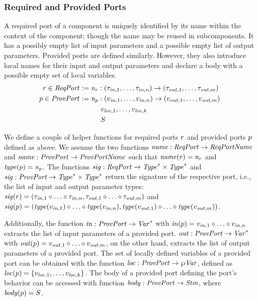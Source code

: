 \documentclass[a4paper,10pt,english]{article}
\begin{document}
\subsubsection{Required and Provided Ports}
A required port of a component is uniquely identified by its name within the context of the component; though the name may be
reused in subcomponents. It has a possibly empty list of input parameters and a possible empty list of output parameters. 
Provided ports are defined similarly. However, they also introduce local names for their input and output parameters and declare a
body with a possible empty set of local variables. 
\begin{align*}
	r \in \mathit{ReqPort} &:= \mathit{n_r} \; \mathtt{:} \; \mathtt{(} \tau_{\mathit{in}, 1}, \ldots, \tau_{\mathit{in}, n} \mathtt{) \rightarrow (} \tau_{\mathit{out},
	1}, \ldots, \tau_{\mathit{out}, m} \mathtt{)} \\
	p \in \mathit{ProvPort} &:= \mathit{n_p} \; \mathtt{:} \; \mathtt{(} v_{\mathit{in}, 1}, \ldots, v_{\mathit{in}, n} \mathtt{) \rightarrow (} v_{\mathit{out}, 1}, \ldots, v_{\mathit{out}, m} \mathtt{)} \; \\&\qquad\quad v_{\mathit{loc}, 1}, \ldots, v_{\mathit{loc}, k} \\&\qquad\quad S
\end{align*}

We define a couple of helper functions for required ports $r$ and provided ports $p$ defined as above. We assume
the two functions $\mathit{name} : \mathit{ReqPort} \rightarrow \mathit{ReqPortName}$ and $\mathit{name} : \mathit{ProvPort} \rightarrow \mathit{ProvPortName}$ such that
$\mathit{name}(r) = \mathit{n_r}$ and $\mathit{type}(p) = \mathit{n_p}$.
The functions $\mathit{sig} :
\mathit{ReqPort} \rightarrow \mathit{Type}^* \times \mathit{Type}^*$ and $\mathit{sig} : \mathit{ProvPort} \rightarrow \mathit{Type}^* \times
\mathit{Type}^*$ return the signature of the respective port, i.e., the list of input and output parameter types:
$\mathit{sig}(r) = (\tau_{\mathit{in}, 1} \circ \ldots \circ \tau_{\mathit{in}, n}, \tau_{\mathit{out}, 1} \circ \ldots
\circ \tau_{\mathit{out}, m})$ and $\mathit{sig}(p) = (\mathit{type}(v_{\mathit{in}, 1}) \circ \ldots \circ
\mathit{type}(v_{\mathit{in}, n}), \mathit{type}(v_{\mathit{out}, 1}) \circ \ldots \circ \mathit{type}(v_{\mathit{out}, m}))$.

Additionally, the function $\mathit{in} : \mathit{ProvPort} \rightarrow \mathit{Var}^*$ with $\mathit{in}(p) = v_{\mathit{in}, 1} \circ
\ldots \circ v_{\mathit{in}, n}$ extracts the list of input parameters of a provided port. $\mathit{out} : \mathit{ProvPort} \rightarrow
\mathit{Var}^*$ with $\mathit{out}(p) = v_{\mathit{out}, 1} \circ \ldots \circ v_{\mathit{out}, m}$, on the other hand,
extracts the list of output parameters of a provided port. The set of locally defined variables of a provided port can be obtained
with the function $\mathit{loc} : \mathit{ProvPort} \rightarrow
\wp \mathit{Var}$, defined as $\mathit{loc}(p) = \{v_{\mathit{loc}, 1}, \ldots, v_{\mathit{loc}, k}\}$. The body of a
provided port defining the port's behavior can be accessed with function $\mathit{body} : \mathit{ProvPort} \rightarrow \mathit{Stm}$, where
$\mathit{body}(p) = S$.
\end{document}
